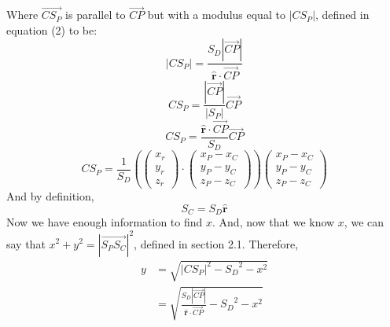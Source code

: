 \documentclass{article}
\begin{document}
	Where $\overrightarrow{C S_P}$ is parallel to $\overrightarrow{CP}$ but with a modulus equal to $\left|CS_P\right|$, defined in equation (2) to be:
	$$\left|C S_P\right| = \frac{S_D \left|\overrightarrow{CP}\right| }{ \hat{\mathbf{r}} \cdot \overrightarrow{CP}}$$
 	$$C S_P = \frac{\left|\overrightarrow{CP}\right|}{\left|S_P\right|} \overrightarrow{CP}$$
	$$C S_P = \frac{\hat{\mathbf{r}} \cdot \overrightarrow{CP}}{S_D} \overrightarrow{CP} $$
	$$C S_P = \frac{1}{S_D} \left( \begin{pmatrix}x_r\\y_r\\z_r\end{pmatrix} \cdot \begin{pmatrix}x_P-x_C\\y_P - y_C\\z_P - z_C 
	\end{pmatrix} \right) \begin{pmatrix}x_P-x_C\\y_P - y_C\\z_P - z_C \end{pmatrix}
	$$
	And by definition,
	$$ S_C = S_D \hat{\mathbf{r}}$$
	Now we have enough information to find $x$. And, now that we know $x$, we can say that $x^2 + y^2 = \left|\overrightarrow{S_P 
	S_C}\right|^2$, defined in section 2.1. Therefore,
	\begin{align*}
		y & = \sqrt{ \left|C S_P\right|^2 - {S_D} ^2 - x^2}\\
		& = \sqrt{\frac{S_D \left|\overrightarrow{CP}\right| }{ \hat{\mathbf{r}} \cdot \overrightarrow{CP}} - {S_D}^2 - x^2}
	\end{align*}
			

	
\end{document}
